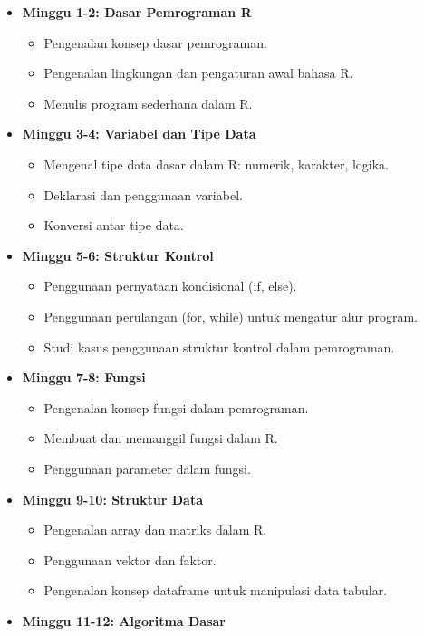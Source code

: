 \documentclass[
]{book}
\providecommand{\tightlist}{%
  \setlength{\itemsep}{0pt}\setlength{\parskip}{0pt}}
\begin{document}
\begin{itemize}
\tightlist
\item
  \textbf{Minggu 1-2: Dasar Pemrograman R}

  \begin{itemize}
  \tightlist
  \item
    Pengenalan konsep dasar pemrograman.
  \item
    Pengenalan lingkungan dan pengaturan awal bahasa R.
  \item
    Menulis program sederhana dalam R.
  \end{itemize}
\item
  \textbf{Minggu 3-4: Variabel dan Tipe Data}

  \begin{itemize}
  \tightlist
  \item
    Mengenal tipe data dasar dalam R: numerik, karakter, logika.
  \item
    Deklarasi dan penggunaan variabel.
  \item
    Konversi antar tipe data.
  \end{itemize}
\item
  \textbf{Minggu 5-6: Struktur Kontrol}

  \begin{itemize}
  \tightlist
  \item
    Penggunaan pernyataan kondisional (if, else).
  \item
    Penggunaan perulangan (for, while) untuk mengatur alur program.
  \item
    Studi kasus penggunaan struktur kontrol dalam pemrograman.
  \end{itemize}
\item
  \textbf{Minggu 7-8: Fungsi}

  \begin{itemize}
  \tightlist
  \item
    Pengenalan konsep fungsi dalam pemrograman.
  \item
    Membuat dan memanggil fungsi dalam R.
  \item
    Penggunaan parameter dalam fungsi.
  \end{itemize}
\item
  \textbf{Minggu 9-10: Struktur Data}

  \begin{itemize}
  \tightlist
  \item
    Pengenalan array dan matriks dalam R.
  \item
    Penggunaan vektor dan faktor.
  \item
    Pengenalan konsep dataframe untuk manipulasi data tabular.
  \end{itemize}
\item
  \textbf{Minggu 11-12: Algoritma Dasar}


\end{itemize}
\end{document}
